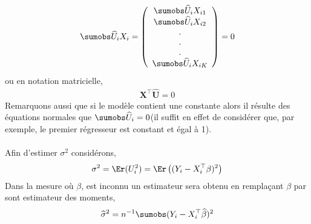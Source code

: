 \begin{align}
 \sumobs \widehat{U}_iX_i=
\left(
\begin{array}{c}
\sumobs \widehat{U}_iX_{i1}\\
\sumobs \widehat{U}_iX_{i2}\\
.\\
.\\
.\\
\sumobs \widehat{U}_iX_{iK}
\end{array}
\right)
=0
\label{eq10}
\end{align}
ou en notation matricielle,
\begin{align}
\mathbf{X}^\top\widehat{\mathbf{U}} = 0
\label{eq11}
\end{align}
Remarquons aussi que si le modèle contient une constante alors il résulte des équations normales que $\sumobs \widehat{U}_i = 0$(il suffit en effet de considérer que, par exemple, le premier régresseur est constant et égal à 1).\\\\
Afin d'estimer $\sigma^2$ considérons,
\begin{align*}
\sigma^2 = \Er(U_i^2)=\Er\left((Y_i - X_i^\top\beta)^2\right)
\end{align*}
Dans la mesure où $\beta$, est inconnu un estimateur  sera obtenu en remplaçant $\beta$ par sont estimateur des moments,
\begin{align}
\widehat{\sigma}^2 = n^{-1}\sumobs(Y_i-X_i^\top\widehat{\beta})^2
\label{eq12}
\end{align}

